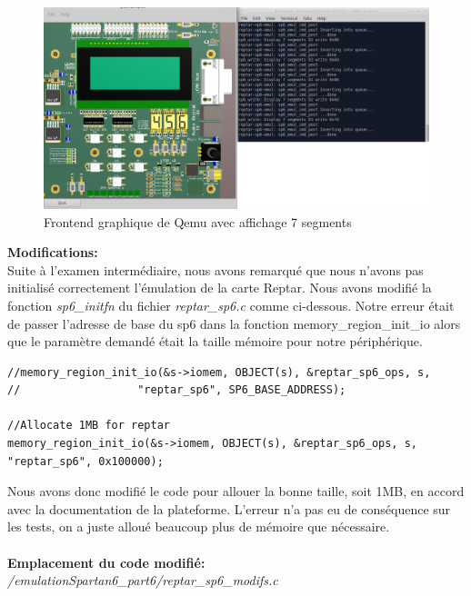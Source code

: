 \begin{figure}[H]
	\begin{center}
		\includegraphics[width=15cm]{img/emulation2.png}
		\caption{Frontend graphique de Qemu avec affichage 7 segments}
		\label{emulation2}
	\end{center}
\end{figure}
\textbf{Modifications: }\\ Suite à l'examen intermédiaire, nous avons remarqué que nous n'avons pas initialisé correctement l'émulation de la carte Reptar. Nous avons modifié la fonction \textit{sp6\_initfn} du fichier \textit{reptar\_sp6.c} comme ci-dessous. Notre erreur était de passer l'adresse de base du sp6 dans la fonction memory\_region\_init\_io alors que le paramètre demandé était la taille mémoire pour notre périphérique. 
\begin{lstlisting}
//memory_region_init_io(&s->iomem, OBJECT(s), &reptar_sp6_ops, s,
//                  "reptar_sp6", SP6_BASE_ADDRESS);

//Allocate 1MB for reptar
memory_region_init_io(&s->iomem, OBJECT(s), &reptar_sp6_ops, s,
"reptar_sp6", 0x100000);
\end{lstlisting}
Nous avons donc modifié le code pour allouer la bonne taille, soit 1MB, en accord avec la documentation de la plateforme. L'erreur n'a pas eu de conséquence sur les tests, on a juste alloué beaucoup plus de mémoire que nécessaire.\\\\
\textbf{Emplacement du code modifié: }\textit{/emulationSpartan6\_part6/reptar\_sp6\_modifs.c}
